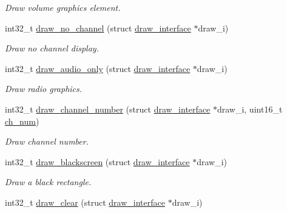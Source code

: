 \begin{DoxyCompactItemize}
\begin{DoxyCompactList}\small\item\em Draw volume graphics element. \end{DoxyCompactList}\item 
int32\+\_\+t \hyperlink{group__drawing_ga9e57d07e991e2d951ad273cde5d5518a}{draw\+\_\+no\+\_\+channel} (struct \hyperlink{structdraw__interface}{draw\+\_\+interface} $\ast$draw\+\_\+i)\hypertarget{group__drawing_ga9e57d07e991e2d951ad273cde5d5518a}{}\label{group__drawing_ga9e57d07e991e2d951ad273cde5d5518a}

\begin{DoxyCompactList}\small\item\em Draw no channel display. \end{DoxyCompactList}\item 
int32\+\_\+t \hyperlink{group__drawing_ga4136711e3d32c79bf3261c2afb901b6f}{draw\+\_\+audio\+\_\+only} (struct \hyperlink{structdraw__interface}{draw\+\_\+interface} $\ast$draw\+\_\+i)\hypertarget{group__drawing_ga4136711e3d32c79bf3261c2afb901b6f}{}\label{group__drawing_ga4136711e3d32c79bf3261c2afb901b6f}

\begin{DoxyCompactList}\small\item\em Draw radio graphics. \end{DoxyCompactList}\item 
int32\+\_\+t \hyperlink{group__drawing_gab0f56761fdebd9a7bc3584a43777df94}{draw\+\_\+channel\+\_\+number} (struct \hyperlink{structdraw__interface}{draw\+\_\+interface} $\ast$draw\+\_\+i, uint16\+\_\+t \hyperlink{structures_8h_abcdde739cb26f5c6c2c0b87e83d1f421}{ch\+\_\+num})\hypertarget{group__drawing_gab0f56761fdebd9a7bc3584a43777df94}{}\label{group__drawing_gab0f56761fdebd9a7bc3584a43777df94}

\begin{DoxyCompactList}\small\item\em Draw channel number. \end{DoxyCompactList}\item 
int32\+\_\+t \hyperlink{group__drawing_ga07cd1d9f76609e912c17aa865cffa403}{draw\+\_\+blackscreen} (struct \hyperlink{structdraw__interface}{draw\+\_\+interface} $\ast$draw\+\_\+i)\hypertarget{group__drawing_ga07cd1d9f76609e912c17aa865cffa403}{}\label{group__drawing_ga07cd1d9f76609e912c17aa865cffa403}

\begin{DoxyCompactList}\small\item\em Draw a black rectangle. \end{DoxyCompactList}\item 
int32\+\_\+t \hyperlink{group__drawing_ga7e0866c8dbb4ef95d3708b7fa1a0393d}{draw\+\_\+clear} (struct \hyperlink{structdraw__interface}{draw\+\_\+interface} $\ast$draw\+\_\+i)\hypertarget{group__drawing_ga7e0866c8dbb4ef95d3708b7fa1a0393d}{}\label{group__drawing_ga7e0866c8dbb4ef95d3708b7fa1a0393d}


\end{DoxyCompactItemize}
